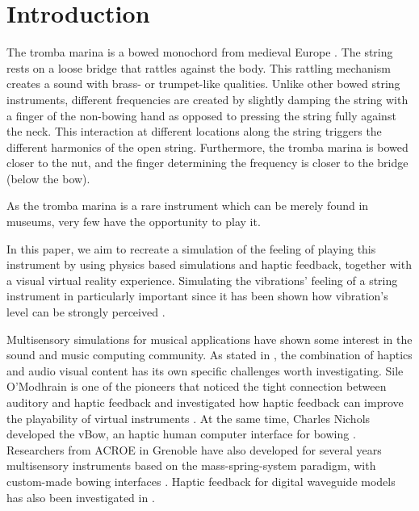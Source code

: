 \documentclass{article}
\title{\papertitle}
\begin{document}
%
\capstartfalse
\maketitle
\capstarttrue
%
\begin{abstract}
Tromba stuff Phantom omni

PHANTOM Omni for control and haptic feedback.

This paper presents the implementation and the evaluation of a VR bowed string instrument.  
Quick results
\end{abstract}
%

\section{Introduction}\label{sec:introduction}
The tromba marina is a bowed monochord from medieval Europe \cite{encyclopaedia2020}. The string rests on a loose bridge that rattles against the body. This rattling mechanism creates a sound with brass- or trumpet-like qualities. Unlike other bowed string instruments, different frequencies are created by slightly damping the string with a finger of the non-bowing hand as opposed to pressing the string fully against the neck. This interaction at different locations along the string triggers the different harmonics of the open string. Furthermore, the tromba marina is bowed closer to the nut, and the finger determining the frequency is closer to the bridge (below the bow).

As the tromba marina is a rare instrument which can be merely found in museums, very few have the opportunity to play it.

In this paper, we aim to recreate a simulation of the feeling of playing this instrument by using physics based simulations and haptic feedback, together with a visual virtual reality experience.
Simulating the vibrations' feeling of a string instrument in particularly important since it has been shown how vibration's level can be strongly perceived \cite{askenfelt1992vibration}. 

Multisensory simulations for musical applications have shown some interest in the sound and music computing community. 
As stated in 
\cite{danieau2012enhancing}, the combination of haptics and audio visual content has its own specific challenges worth investigating.
Sile O'Modhrain is one of the pioneers that noticed the tight connection between auditory and haptic feedback and investigated how haptic feedback can improve the playability of virtual instruments \cite{o2001playing}.
At the same time, Charles Nichols developed the vBow, an haptic human computer interface for bowing \cite{nichols2002vbow}.
Researchers from ACROE in Grenoble have also developed for several years multisensory instruments based on the mass-spring-system paradigm, with custom-made bowing interfaces \cite{florens1990modeles,luciani2005action}.
Haptic feedback for digital waveguide models has also been investigated in \cite{sinclair2009audio}.
\end{document}
